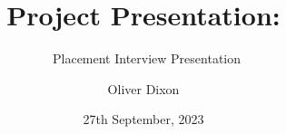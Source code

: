 \documentclass{beamer}
\title[Placement Interview Presentation]{Project Presentation: \programname}
\subtitle{\companyname\ Placement Interview Presentation}
\author{Oliver Dixon}
\institute[University of York]
    {Department of Computer Science, University of York}
\date{27th September, 2023}
\numberwithin{figure}{section}
\begin{document}
\frame{\titlepage}
\end{document}
